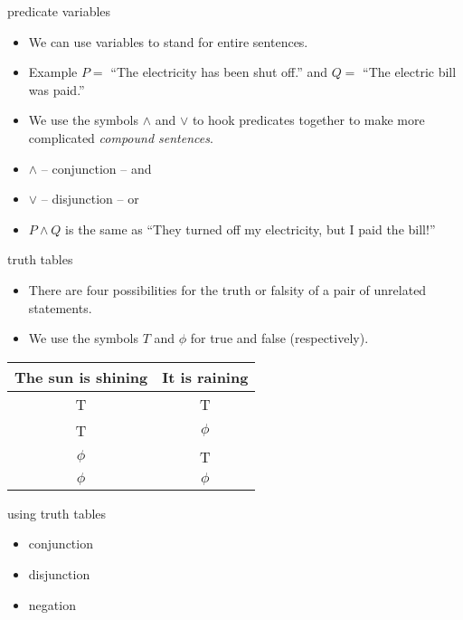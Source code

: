 \documentclass[landscape]{beamer}
\begin{document}
\begin{frame}{predicate variables}
\begin{itemize}
\item We can use variables to stand for entire sentences. \pause
\item Example $P =$ ``The electricity has been shut off.'' and $Q =$ ``The electric bill was paid.'' \pause
\item We use the symbols $\land$ and $\lor$ to hook predicates together to make more complicated {\em compound sentences}. \pause
\item $\land$ -- conjunction -- and \pause
\item $\lor$ -- disjunction -- or \pause
\item $P \land Q$ is the same as ``They turned off my electricity, but I paid the bill!''
\end{itemize}
\end{frame}

\begin{frame}{truth tables}
\begin{itemize}
\item There are four possibilities for the truth or falsity of a pair of unrelated statements.\pause
\item We use the symbols $T$ and $\phi$ for true and false (respectively). \pause
\end{itemize}

\begin{center}
\begin{tabular}{c|c}
The sun is shining \; & \; It is raining \\ \hline
T & T \\
T & $\phi$ \\
 $\phi$ & T \\
 $\phi$ &  $\phi$ \\
\end{tabular}
\end{center}

\end{frame}

\begin{frame}{using truth tables}
\begin{itemize}
\item conjunction \pause
\item disjunction \pause
\item negation
\end{itemize}
\end{frame}
\end{document}

